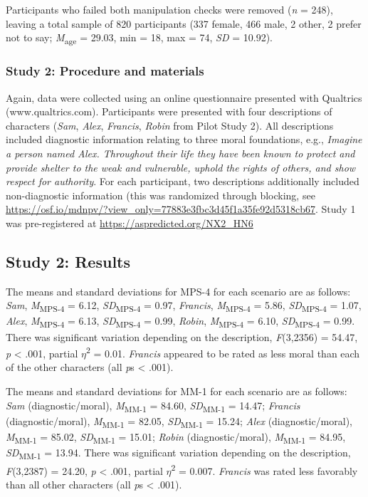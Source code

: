 \documentclass[
  english,
  man,floatsintext]{apa7}
\begin{document}
Participants who failed both manipulation checks were removed (\emph{n} = 248), leaving a total sample of 820 participants (337 female, 466 male, 2 other, 2 prefer not to say; \emph{M}\textsubscript{age} = 29.03, min = 18, max = 74, \emph{SD} = 10.92).

\hypertarget{study-2-procedure-and-materials}{%
\subsubsection{Study 2: Procedure and materials}\label{study-2-procedure-and-materials}}

Again, data were collected using an online questionnaire presented with Qualtrics (www.qualtrics.com). Participants were presented with four descriptions of characters (\emph{Sam}, \emph{Alex}, \emph{Francis}, \emph{Robin} from Pilot Study 2). All descriptions included diagnostic information relating to three moral foundations, e.g., \emph{Imagine a person named Alex. Throughout their life they have been known to protect and provide shelter to the weak and vulnerable, uphold the rights of others, and show respect for authority}. For each participant, two descriptions additionally included non-diagnostic information (this was randomized through blocking, see \color{blue}\url{https://osf.io/mdnpv/?view_only=77883e3fbc3d45f1a35fe92d5318cb67}\color{black}. Study 1 was pre-registered at \color{blue}\url{https://aspredicted.org/NX2_HN6}\color{black}

\hypertarget{study-2-results}{%
\subsection{Study 2: Results}\label{study-2-results}}

The means and standard deviations for MPS-4 for each scenario are as follows:
\emph{Sam},
\emph{M}\textsubscript{MPS-4} = 6.12, \emph{SD}\textsubscript{MPS-4} = 0.97,
\emph{Francis},
\emph{M}\textsubscript{MPS-4} = 5.86, \emph{SD}\textsubscript{MPS-4} = 1.07,
\emph{Alex},
\emph{M}\textsubscript{MPS-4} = 6.13, \emph{SD}\textsubscript{MPS-4} = 0.99,
\emph{Robin},
\emph{M}\textsubscript{MPS-4} = 6.10, \emph{SD}\textsubscript{MPS-4} = 0.99. There was significant variation depending on the description, \emph{F}(3,2356) = 54.47, \emph{p} \textless{} .001, partial \(\eta\)\textsuperscript{2} = 0.01. \emph{Francis} appeared to be rated as less moral than each of the other characters (all \emph{p}s \textless{} .001).

The means and standard deviations for MM-1 for each scenario are as follows:
\emph{Sam} (diagnostic/moral),
\emph{M}\textsubscript{MM-1} = 84.60, \emph{SD}\textsubscript{MM-1} = 14.47;
\emph{Francis} (diagnostic/moral),
\emph{M}\textsubscript{MM-1} = 82.05, \emph{SD}\textsubscript{MM-1} = 15.24;
\emph{Alex} (diagnostic/moral),
\emph{M}\textsubscript{MM-1} = 85.02, \emph{SD}\textsubscript{MM-1} = 15.01;
\emph{Robin} (diagnostic/moral),
\emph{M}\textsubscript{MM-1} = 84.95, \emph{SD}\textsubscript{MM-1} = 13.94. There was significant variation depending on the description, \emph{F}(3,2387) = 24.20, \emph{p} \textless{} .001, partial \(\eta\)\textsuperscript{2} = 0.007. \emph{Francis} was rated less favorably than all other characters (all \emph{p}s \textless{} .001).
\end{document}
